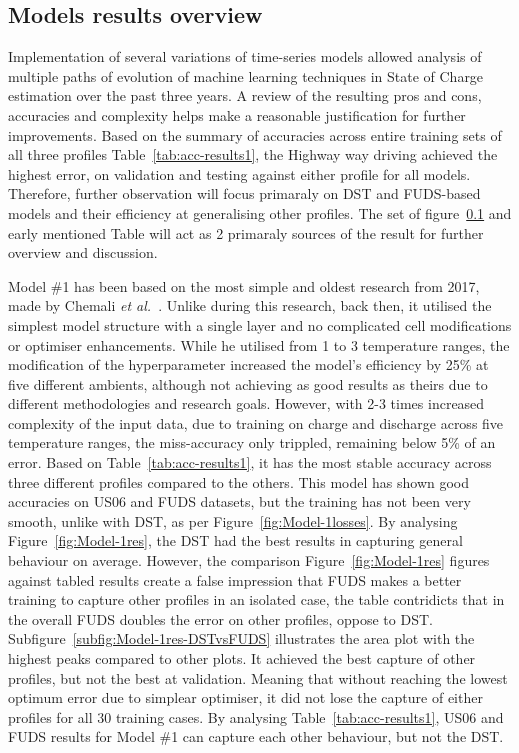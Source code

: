 %
%
\subsection{Models results overview}
Implementation of several variations of time-series models allowed analysis of multiple paths of evolution of machine learning techniques in State of Charge estimation over the past three years.
A review of the resulting pros and cons, accuracies and complexity helps make a reasonable justification for further improvements.
Based on the summary of accuracies across entire training sets of all three profiles Table~\ref{tab:acc-results1}, the Highway way driving achieved the highest error, on validation and testing against either profile for all models.
Therefore, further observation will focus primaraly on DST and FUDS-based models and their efficiency at generalising other profiles.
The set of figure~\ref{} and early mentioned Table will act as 2 primaraly sources of the result for further overview and discussion.

%
%
Model \#1 has been based on the most simple and oldest research from 2017, made by Chemali \textit{et al.}~\cite{Chemali2017}.
Unlike during this research, back then, it utilised the simplest model structure with a single layer and no complicated cell modifications or optimiser enhancements.
While he utilised from 1 to 3 temperature ranges, the modification of the hyperparameter increased the model's efficiency by 25\% at five different ambients, although not achieving as good results as theirs due to different methodologies and research goals.
However, with 2-3 times increased complexity of the input data, due to training on charge and discharge across five temperature ranges, the miss-accuracy only trippled, remaining below 5\% of an error.
Based on Table~\ref{tab:acc-results1}, it has the most stable accuracy across three different profiles compared to the others.
This model has shown good accuracies on US06 and FUDS datasets, but the training has not been very smooth, unlike with DST, as per Figure~\ref{fig:Model-1losses}.
By analysing Figure~\ref{fig:Model-1res}, the DST had the best results in capturing general behaviour on average.
However, the comparison Figure~\ref{fig:Model-1res} figures against tabled results create a false impression that FUDS makes a better training to capture other profiles in an isolated case, the table contridicts that in the overall FUDS doubles the error on other profiles, oppose to DST.
Subfigure~\ref{subfig:Model-1res-DSTvsFUDS} illustrates the area plot with the highest peaks compared to other plots.
It achieved the best capture of other profiles, but not the best at validation. Meaning that without reaching the lowest optimum error due to simplear optimiser, it did not lose the capture of either profiles for all 30 training cases.
By analysing Table~\ref{tab:acc-results1}, US06 and FUDS results for Model \#1 can capture each other behaviour, but not the DST.


